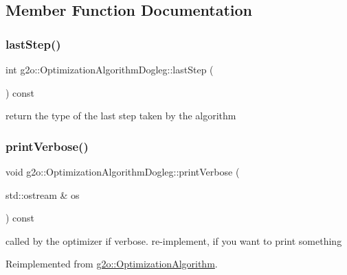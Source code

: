 \subsection{Member Function Documentation}
\mbox{\label{classg2o_1_1_optimization_algorithm_dogleg_a0ca98964e7bcde0c893eb9d720a26fd1}} 
\subsubsection{\texorpdfstring{last\+Step()}{lastStep()}}
{\footnotesize\ttfamily int g2o\+::\+Optimization\+Algorithm\+Dogleg\+::last\+Step (\begin{DoxyParamCaption}{ }\end{DoxyParamCaption}) const\hspace{0.3cm}{\ttfamily [inline]}}



return the type of the last step taken by the algorithm 

\mbox{\label{classg2o_1_1_optimization_algorithm_dogleg_a48f424443a7b2b6e8c532204cd7334cd}} 
\subsubsection{\texorpdfstring{print\+Verbose()}{printVerbose()}}
{\footnotesize\ttfamily void g2o\+::\+Optimization\+Algorithm\+Dogleg\+::print\+Verbose (\begin{DoxyParamCaption}\item[{std\+::ostream \&}]{os }\end{DoxyParamCaption}) const\hspace{0.3cm}{\ttfamily [virtual]}}

called by the optimizer if verbose. re-\/implement, if you want to print something 

Reimplemented from \mbox{\hyperlink{classg2o_1_1_optimization_algorithm_a6683d35e67402b50924bc4744b6e282a}{g2o\+::\+Optimization\+Algorithm}}.

